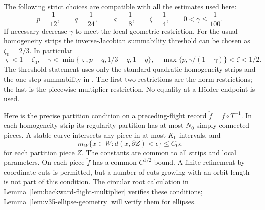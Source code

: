 The following strict choices are compatible with all the estimates used
here:
\begin{equation}\label{eq:v35-exponent-choice}
 p=\frac1{12},\qquad q=\frac1{24},\qquad
 \varsigma=\frac18,\qquad \zeta=\frac14,\qquad
 0<\gamma\le\frac1{100}.
\end{equation}
If necessary decrease $\gamma$ to meet the local geometric restriction.
For the usual homogeneity strips the inverse-Jacobian summability
threshold can be chosen as $\zeta_0=2/3$. In particular
\[
 \varsigma<1-\zeta_0,\quad
 \gamma<\min\{\varsigma,p-q,1/3-q,1-q\},\quad
 \max\{p,\gamma/(1-\gamma)\}<\zeta<1/2.
\]
The threshold statement uses only the standard quadratic homogeneity
strips and the one-step summability in \cite[Section 3.1]{DZ}.
The first two restrictions are the norm restrictions; the last is the
piecewise multiplier restriction. No equality at a H\"older endpoint is
used.

Here is the precise partition condition on a preceding-flight record
$\check f=f\circ T^{-1}$. In each homogeneity strip its regularity
partition has at most $N_0$ simply connected pieces. A stable curve
intersects any piece in at most $K_0$ intervals, and
\begin{equation}\label{eq:v35-partition-boundary}
 m_W\{x\in W:d(x,\partial Z)<\epsilon\}\le C_0\epsilon
\end{equation}
for each partition piece $Z$. The constants are common to all strips
and local parameters. On each piece $\check f$ has a common
$C^{1/2}$ bound. A finite refinement by coordinate cuts is permitted,
but a number of cuts growing with an orbit length is not part of this
condition. The circular root calculation in
Lemma~\ref{lem:backward-flight-multiplier} verifies these conditions;
Lemma~\ref{lem:v35-ellipse-geometry} will verify them for ellipses.

